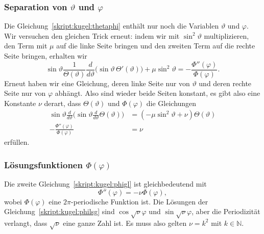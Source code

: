 \subsubsection{Separation von $\vartheta$ und $\varphi$}
Die Gleichung~\eqref{skript:kugel:thetaphi} enthält nur noch die
Variablen $\vartheta$ und $\varphi$. 
Wir versuchen den gleichen Trick erneut: indem wir mit $\sin^2\vartheta$
multiplizieren, den Term mit $\mu$ auf die linke Seite bringen und
den zweiten Term auf die rechte Seite bringen, erhalten wir
\[
\sin\vartheta
\frac{1}{\Theta(\vartheta)}
\frac{d}{d\vartheta}\bigl(\sin\vartheta\,\Theta'(\vartheta)\bigr)
+
\mu\sin^2\vartheta
=
-\frac{\Phi''(\varphi)}{\Phi(\varphi)}.
\]
Erneut haben wir eine Gleichung, deren linke Seite nur von $\vartheta$
und deren rechte Seite nur von $\varphi$ abhängt.
Also sind wieder beide Seiten konstant, es gibt also eine Konstante
$\nu$ derart, dass $\Theta(\vartheta)$ und $\Phi(\varphi)$ die 
Gleichungen
\begin{align}
\sin\vartheta\frac{d}{d\vartheta}
\biggl(
\sin\vartheta\frac{d}{d\vartheta}\Theta(\vartheta)
\biggr)
&=
(-\mu\sin^2\vartheta+\nu)\Theta(\vartheta)
\label{skript:kugel:thetagl}
\\
-\frac{\Phi''(\varphi)}{\Phi(\varphi)}&=\nu
\label{skript:kugel:phigl}
\end{align}
erfüllen.

\subsubsection{Lösungsfunktionen $\Phi(\varphi)$}
Die zweite Gleichung~\eqref{skript:kugel:phigl} ist gleichbedeutend mit
\begin{equation}
\Phi''(\varphi)=-\nu\Phi(\varphi),
\label{skript:kugel:philsg}
\end{equation}
wobei $\Phi(\varphi)$ eine $2\pi$-periodische Funktion ist.
Die Lösungen der Gleichung~\eqref{skript:kugel:philsg}
sind $\cos\sqrt{\nu}\varphi$ und $\sin\sqrt{\nu}\varphi$,
aber die Periodizität verlangt, dass $\sqrt{\nu}$ eine ganze Zahl ist.
Es muss also gelten $\nu=k^2$ mit $k\in \mathbb N$.

